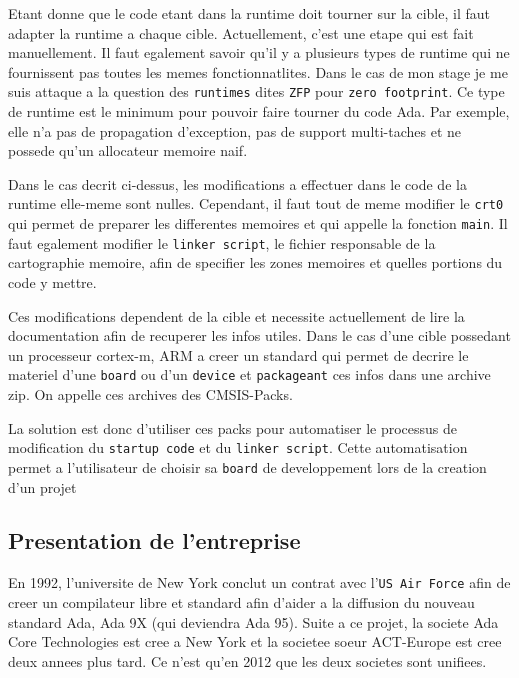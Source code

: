 \documentclass[11pt,]{article}
\begin{document}
Etant donne que le code etant dans la runtime doit tourner sur la cible,
il faut adapter la runtime a chaque cible. Actuellement, c'est une etape
qui est fait manuellement. Il faut egalement savoir qu'il y a plusieurs
types de runtime qui ne fournissent pas toutes les memes
fonctionnatlites. Dans le cas de mon stage je me suis attaque a la
question des \texttt{runtimes} dites \texttt{ZFP} pour
\texttt{zero\ footprint}. Ce type de runtime est le minimum pour pouvoir
faire tourner du code Ada. Par exemple, elle n'a pas de propagation
d'exception, pas de support multi-taches et ne possede qu'un allocateur
memoire naif.

Dans le cas decrit ci-dessus, les modifications a effectuer dans le code
de la runtime elle-meme sont nulles. Cependant, il faut tout de meme
modifier le \texttt{crt0} qui permet de preparer les differentes
memoires et qui appelle la fonction \texttt{main}. Il faut egalement
modifier le \texttt{linker\ script}, le fichier responsable de la
cartographie memoire, afin de specifier les zones memoires et quelles
portions du code y mettre.

Ces modifications dependent de la cible et necessite actuellement de
lire la documentation afin de recuperer les infos utiles. Dans le cas
d'une cible possedant un processeur cortex-m, ARM a creer un standard
qui permet de decrire le materiel d'une \texttt{board} ou d'un
\texttt{device} et \texttt{packageant} ces infos dans une archive zip.
On appelle ces archives des CMSIS-Packs.

La solution est donc d'utiliser ces packs pour automatiser le processus
de modification du \texttt{startup\ code} et du \texttt{linker\ script}.
Cette automatisation permet a l'utilisateur de choisir sa \texttt{board}
de developpement lors de la creation d'un projet

\subsection{Presentation de
l'entreprise}\label{presentation-de-lentreprise}

En 1992, l'universite de New York conclut un contrat avec
l'\texttt{US\ Air\ Force} afin de creer un compilateur libre et standard
afin d'aider a la diffusion du nouveau standard Ada, Ada 9X (qui
deviendra Ada 95). Suite a ce projet, la societe Ada Core Technologies
est cree a New York et la societee soeur ACT-Europe est cree deux annees
plus tard. Ce n'est qu'en 2012 que les deux societes sont unifiees.
\end{document}
